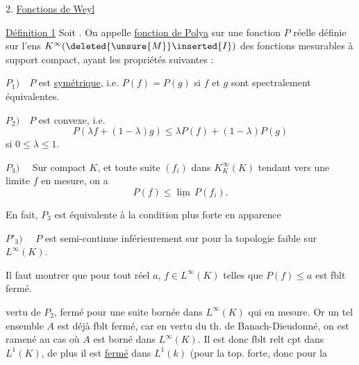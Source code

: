 2. \uline{Fonctions de Weyl}


\uline{Définition 1} Soit  \inserted{\(I=]0,\omega[\quad(0<\omega\le+\infty)\)}. On appelle \uline{fonction de Polya} sur  une fonction \(P\) réelle définie sur l'ens \(K^\infty(\deleted{\unsure{M}}\inserted{I})\) des fonctions mesurables à support compact, ayant les propriétés suivantes :


\(P_1)\quad P\) est \uline{symétrique}, i.e. \(P(f)=P(g)\) si \(f\) et \(g\) sont spectralement équivalentes.

\(P_2)\quad P\) est convexe, i.e.
\[
P(\lambda f+(1-\lambda)g)\le\lambda P(f)+(1-\lambda)P(g)
\]
si \(0\le\lambda\le1\).

\(P_3)\quad\) Sur  compact \(K\),  et toute suite \((f_i)\) dans \(K^\infty_K(K)\) tendant vers une  limite \(f\) en mesure, on a
\[
P(f)\le\underline{\lim}\,P(f_i).
\]

En fait, \(P_3\) est équivalente à la condition plus forte en apparence

\(P'_3)\quad\)  \(P\) est semi-continue inférieurement sur  pour la topologie faible sur \(L^\infty(K)\).

Il faut montrer que pour tout réel \(a\), \deleted{\(P^{-1}([\unsure{-\infty,a}[)\)}   \(f\in L^\infty(K)\) telles que \(P(f)\le a\) est fblt fermé.



 vertu de \(P_2\),   fermé pour une suite bornée dans \(L^\infty(K)\) qui  en mesure. Or un tel ensemble \(A\) est déjà fblt fermé, car en vertu du th. de Banach-Dieudonné, on est ramené au cas où \(A\) est borné dans \(L^\infty(K)\). Il est donc fblt relt cpt dans \(L^{1}(K)\),  de plus il est \uline{fermé} dans \(L^1(k)\) (pour la top. forte, donc pour la

